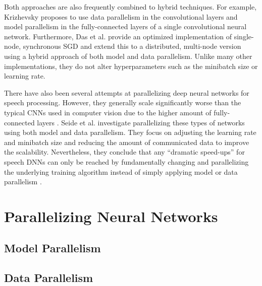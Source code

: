 \documentclass[conference,compsoc,a4paper]{IEEEtran}
\begin{document}
Both approaches are also frequently combined to hybrid techniques.
For example, Krizhevsky \cite{krizhevsky2014-One-weird-trick} proposes to use data parallelism in the convolutional layers and model parallelism in the fully-connected layers of a single convolutional neural network.
%
Furthermore, Das et al. \cite{das2016-Distributed-deep-learning} provide an optimized implementation of single-node, synchronous SGD and extend this to a distributed, multi-node version using a hybrid approach of both model and data parallelism.
Unlike many other implementations, they do not alter hyperparameters such as the minibatch size or learning rate.

There have also been several attempts at parallelizing deep neural networks for speech processing.
However, they generally scale significantly worse than the typical CNNs used in computer vision due to the higher amount of fully-connected layers \cite{dean2012-Large-scale-distributed,seide2014-Speech-DNNs}.
Seide et al. \cite{seide2014-Speech-DNNs,seide2014-1-bit-stochastic} investigate parallelizing these types of networks using both model and data parallelism.
They focus on adjusting the learning rate and minibatch size \cite{seide2014-Speech-DNNs} and reducing the amount of communicated data \cite{seide2014-1-bit-stochastic} to improve the scalability.
Nevertheless, they conclude that any ``dramatic speed-ups'' for speech DNNs can only be reached by fundamentally changing and parallelizing the underlying training algorithm instead of simply applying model or data parallelism \cite{seide2014-Speech-DNNs,seide2014-1-bit-stochastic}.


\section{Parallelizing Neural Networks} %
\label{sec:parallelizing_neural_networks}

\subsection{Model Parallelism} %
\label{sub:model_parallelism}


\subsection{Data Parallelism} %
\label{sub:data_parallelism}
\end{document}

